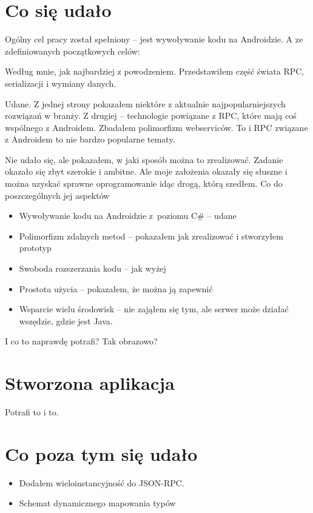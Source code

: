 \section{Co się udało}
Ogólny cel pracy został spełniony -- jest wywoływanie kodu na Androidzie. A ze zdefiniowanych początkowych celów:
\begin{description}
Według mnie, jak najbardziej z powodzeniem. Przedstawiłem część świata RPC, serializacji i wymiany danych.

Udane. Z jednej strony pokazałem niektóre z aktualnie najpopularniejszych rozwiązań w branży. Z drugiej -- technologie powiązane z RPC, które mają coś wspólnego z Androidem. Zbadałem polimorfizm webserviców. To i RPC związane z Androidem to nie bardzo popularne tematy.

Nie udało się, ale pokazałem, w jaki sposób można to zrealizować. Zadanie okazało się zbyt szerokie i ambitne. Ale moje założenia okazały się słuszne i można uzyskać sprawne oprogramowanie idąc drogą, którą szedłem. Co do poszczególnych jej aspektów
\begin{itemize}
  \item Wywoływanie kodu na Androidzie z~poziomu C\# -- udane
	\item Polimorfizm zdalnych metod -- pokazałem jak zrealizować i stworzyłem prototyp
	\item Swoboda rozszerzania kodu -- jak wyżej
	\item Prostota użycia -- pokazałem, że można ją zapewnić
	\item Wsparcie wielu środowisk -- nie zająłem się tym, ale serwer może działać wszędzie, gdzie jest Java.
\end{itemize}

\end{description}

I co to naprawdę potrafi? Tak obrazowo?



\section{Stworzona aplikacja}
Potrafi to i to.



\section{Co poza tym się udało}
\begin{itemize}
	\item Dodałem wieloinstancyjność do JSON-RPC.
	\item Schemat dynamicznego mapowania typów
\end{itemize}


